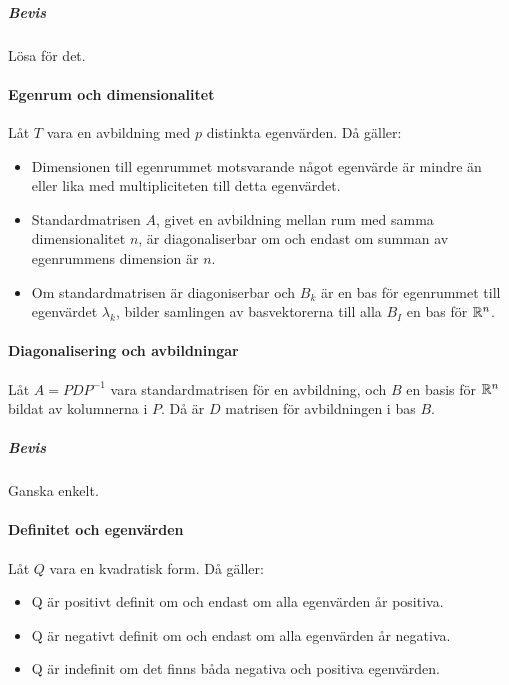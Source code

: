 \subparagraph{Bevis}
Lösa för det.

\paragraph{Egenrum och dimensionalitet}
Låt $T$ vara en avbildning med $p$ distinkta egenvärden. Då gäller:
\begin{itemize}
	\item Dimensionen till egenrummet motsvarande något egenvärde är mindre än eller lika med multipliciteten till detta egenvärdet.
	\item Standardmatrisen $A$, givet en avbildning mellan rum med samma dimensionalitet $n$, är diagonaliserbar om och endast om summan av egenrummens dimension är $n$.
	\item Om standardmatrisen är diagoniserbar och $B_k$ är en bas för egenrummet till egenvärdet $\lambda_k$, bilder samlingen av basvektorerna till alla $B_I$ en bas för $\mathbb{R}^n$.
\end{itemize}

\paragraph{Diagonalisering och avbildningar}
Låt $A = PDP^{-1}$ vara standardmatrisen för en avbildning, och $B$ en basis för $\mathbb{R}^n$ bildat av kolumnerna i $P$. Då är $D$ matrisen för avbildningen i bas $B$.

\subparagraph{Bevis}
Ganska enkelt.

\paragraph{Definitet och egenvärden}
Låt $Q$ vara en kvadratisk form. Då gäller:
\begin{itemize}
	\item Q är positivt definit om och endast om alla egenvärden år positiva.
	\item Q är negativt definit om och endast om alla egenvärden år negativa.
	\item Q är indefinit om det finns båda negativa och positiva egenvärden.
\end{itemize}